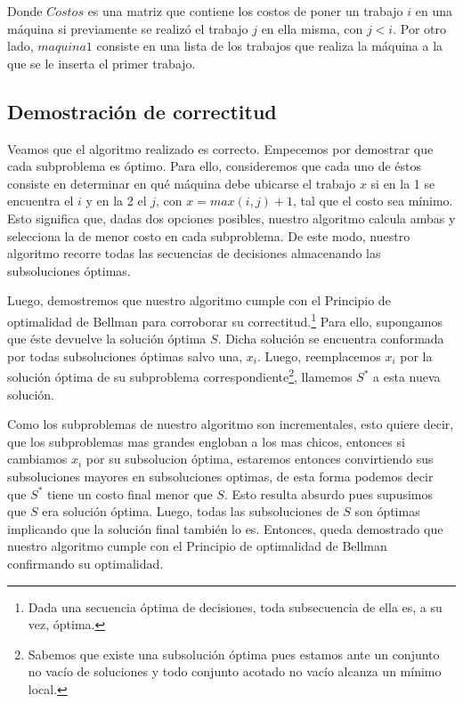 Donde $Costos$ es una matriz que contiene los costos de poner un trabajo $i$ en una máquina si previamente se realizó el trabajo $j$ en ella misma, con $j<i$. Por otro lado, $maquina1$ consiste en una lista de los trabajos que realiza la máquina a la que se le inserta el primer trabajo.

\newpage
\subsection{Demostración de correctitud}

Veamos que el algoritmo realizado es correcto. Empecemos por demostrar que cada subproblema es óptimo. Para ello, consideremos que cada uno de éstos consiste en determinar en qué máquina debe ubicarse el trabajo $x$ si en la 1 se encuentra el $i$ y en la 2 el $j$, con $x=max(i,j)+1$, tal que el costo sea mínimo. Esto significa que, dadas dos opciones posibles, nuestro algoritmo calcula ambas y selecciona la de menor costo en cada subproblema. De este modo, nuestro algoritmo recorre todas las secuencias de decisiones almacenando las subsoluciones óptimas.

Luego, demostremos que nuestro algoritmo cumple con el Principio de optimalidad de Bellman para corroborar su correctitud.\footnote{Dada una secuencia óptima de decisiones, toda subsecuencia de ella es, a su vez, óptima.} Para ello, supongamos que éste devuelve la solución óptima $S$. Dicha solución se encuentra conformada por todas subsoluciones óptimas salvo una, $x_{i}$. Luego, reemplacemos $x_{i}$ por la solución óptima de su subproblema correspondiente\footnote{Sabemos que existe una subsolución óptima pues estamos ante un conjunto no vacío de soluciones y todo conjunto acotado no vacío alcanza un mínimo local.}, llamemos $S^*$ a esta nueva solución. 





Como los subproblemas de nuestro algoritmo son incrementales, esto quiere decir, que los subproblemas mas grandes engloban a los mas chicos, entonces si cambiamos $x_{i}$ por su subsolucion óptima, estaremos entonces convirtiendo sus subsoluciones mayores en subsoluciones optimas, de esta forma podemos decir que $S^*$ tiene un costo final menor que $S$. Esto resulta absurdo pues supusimos que $S$ era solución óptima. Luego, todas las subsoluciones de $S$ son óptimas implicando que la solución final también lo es. Entonces, queda demostrado que nuestro algoritmo cumple con el Principio de optimalidad de Bellman confirmando su optimalidad.

